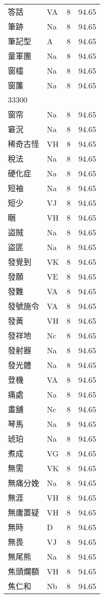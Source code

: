 \documentclass[twocolumn]{book}
\begin{document}
\begin{supertabular}{llrr}
答話 & VA & 8 &  94.65\\
筆跡 & Na & 8 &  94.65\\
筆記型 & A & 8 &  94.65\\
童軍團 & Na & 8 &  94.65\\
窗櫺 & Na & 8 &  94.65\\
窗簾 & Na & 8 &  94.65\\
33300\\
窗帘 & Na & 8 &  94.65\\
窘況 & Na & 8 &  94.65\\
稀奇古怪 & VH & 8 &  94.65\\
稅法 & Na & 8 &  94.65\\
硬化症 & Na & 8 &  94.65\\
短袖 & Na & 8 &  94.65\\
短少 & VJ & 8 &  94.65\\
睏 & VH & 8 &  94.65\\
盜賊 & Na & 8 &  94.65\\
盜匪 & Na & 8 &  94.65\\
發覺到 & VK & 8 &  94.65\\
發願 & VE & 8 &  94.65\\
發難 & VA & 8 &  94.65\\
發號施令 & VA & 8 &  94.65\\
發黃 & VH & 8 &  94.65\\
發祥地 & Nc & 8 &  94.65\\
發射器 & Na & 8 &  94.65\\
發光體 & Na & 8 &  94.65\\
登機 & VA & 8 &  94.65\\
痛處 & Na & 8 &  94.65\\
畫舖 & Nc & 8 &  94.65\\
琴馬 & Na & 8 &  94.65\\
琥珀 & Na & 8 &  94.65\\
煮成 & VG & 8 &  94.65\\
無需 & VK & 8 &  94.65\\
無痛分娩 & Na & 8 &  94.65\\
無涯 & VH & 8 &  94.65\\
無庸置疑 & VH & 8 &  94.65\\
無時 & D & 8 &  94.65\\
無畏 & VJ & 8 &  94.65\\
無尾熊 & Na & 8 &  94.65\\
焦頭爛額 & VH & 8 &  94.65\\
焦仁和 & Nb & 8 &  94.65\\

\end{supertabular}
\end{document}
